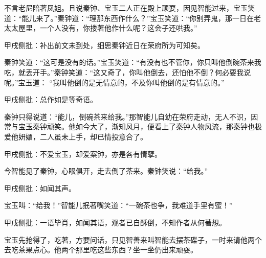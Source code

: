 \begin{parag}
    不言老尼陪著凤姐。且说秦钟、宝玉二人正在殿上顽耍，因见智能过来，宝玉笑道：“能儿来了。”秦钟道：“理那东西作什么？”宝玉笑道：“你别弄鬼，那一日在老太太屋里，一个人没有，你搂著他作什么呢？这会子还哄我。”\begin{note}甲戌侧批：补出前文未到处，细思秦钟近日在荣府所为可知矣。\end{note}秦钟笑道：“这可是没有的话。”宝玉笑道：“有没有也不管你，你只叫他倒碗茶来我吃，就丢开手。”秦钟笑道：“这又奇了，你叫他倒去，还怕他不倒？何必要我说呢。”宝玉道： “我叫他倒的是无情意的，不及你叫他倒的是有情意的。”\begin{note}甲戌侧批：总作如是等奇语。\end{note}秦钟只得说道：“能儿，倒碗茶来给我。”那智能儿自幼在荣府走动，无人不识，因常与宝玉秦钟顽笑。他如今大了，渐知风月，便看上了秦钟人物风流，那秦钟也极爱他妍媚，二人虽未上手，却已情投意合了。\begin{note}甲戌侧批：不爱宝玉，却爱案钟，亦是各有情孽。\end{note}今智能见了秦钟，心眼俱开，走去倒了茶来。秦钟笑说：“给我。”\begin{note}甲戌侧批：如闻其声。\end{note}宝玉叫：“给我！”智能儿抿著嘴笑道：“一碗茶也争，我难道手里有蜜！”\begin{note}甲戌侧批：一语毕肖，如闻其语，观者已自酥倒，不知作者从何著想。\end{note}宝玉先抢得了，吃著，方要问话，只见智善来叫智能去摆茶碟子，一时来请他两个去吃茶果点心。他两个那里吃这些东西？坐一坐仍出来顽耍。
\end{parag}


